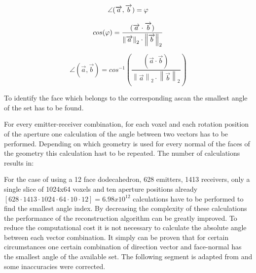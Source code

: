 \begin{equation}
\centering
\angle (\overrightarrow{a},\overrightarrow{b}) = \varphi
\label{eqation_angle}
\end{equation}


\begin{equation}
\centering
cos(\varphi )  =   \frac{(\overrightarrow{a} \cdot \overrightarrow{b})}{\left \| \overrightarrow{a} \right \|_2  \cdot \left \| \overrightarrow{b} \right \|_2}
\label{eqation_cos_phi}
\end{equation}

\begin{equation}
\angle (\overrightarrow{a},\overrightarrow{b}) = 
cos^{-1} \left (  
\frac{(\overrightarrow{a} \cdot \overrightarrow{b})}{\left \| \overrightarrow{a} \right \|_2  \cdot \left \| \overrightarrow{b} \right \|_2} 
\right )
\label{eqation_angle_final}
\end{equation}

To identify the face which belongs to the corresponding \ac{ascan} the smallest angle of the set has to be found.

\qquad





For every emitter-receiver combination, for each voxel and each rotation position of the aperture one calculation of the angle between two vectors has to be performed. Depending on which geometry is used for every normal of the faces of the geometry this calculation hast to be repeated. The number of calculations results in:


For the case of using a 12 face dodecahedron, 628 emitters, 1413 receivers, only a single slice of 1024x64 voxels and ten aperture positions already $[628 \cdot 1413 \cdot 1024 \cdot 64 \cdot 10 \cdot 12] = 6.98x10^{12}$ calculations have to be  performed to find the smallest angle index. By decreasing the complexity of these calculations the performance of the reconstruction algorithm can be greatly improved. To reduce the computational cost it is not necessary to calculate the absolute angle between each vector combination. It simply can be proven that for certain circumstances one certain combination of direction vector and face-normal has the smallest angle of the available set. The following segment is adapted from \cite{PatrickHucker2014EvaluationRuckstreumodells} and some inaccuracies were corrected.

